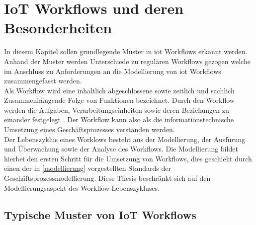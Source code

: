 \documentclass[a4paper, 12pt, twoside, headsepline=true]{scrartcl} %
\begin{document}
\newpage

\section{IoT Workflows und deren Besonderheiten}	%
In diesem Kapitel sollen grundlegende Muster in \ac{iot} Workflows erkannt werden. Anhand der Muster werden Unterschiede zu regulären Workflows gezogen welche im Anschluss zu Anforderungen an die Modellierung von \ac{iot} Workflows zusammengefasst werden. \\

Als Workflow wird eine inhaltlich abgeschlossene sowie zeitlich und sachlich Zusammenhängende Folge von Funktionen bezeichnet. Durch den Workflow werden die Aufgaben, Verarbeitungseinheiten sowie deren Beziehungen zu einander festgelegt \cite{workflowgabler}. Der Workflow kann also als die informationstechnische Umsetzung eines Geschäftsprozesses verstanden werden. \\
Der Lebenszyklus eines Worklows besteht aus der Modellierung, der Ausfürung und Überwachung sowie der Analyse des Workflows. Die Modellierung bildet hierbei den ersten Schritt für die Umsetzung von Workflows, dies geschieht durch einen der in \ref{modellierung} vorgestellten Standards der Geschäftsprozessmodellierung. Diese Thesis beschränkt sich auf den Modellierungsaspekt des Workflow Lebenszykluses.



\subsection{Typische Muster von IoT Workflows} \label{iotmuster}
\end{document}
